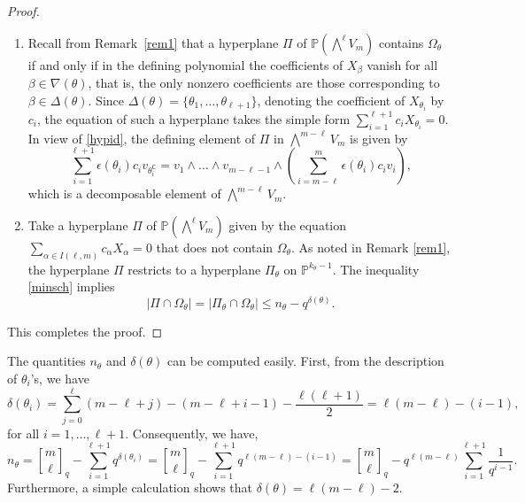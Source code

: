 \documentclass[10pt,a4paper,oneside]{amsproc}
\def\a{{\alpha}}
\def\PP{{\mathbb P}}
\begin{document}
\begin{proof}
    \
    \begin{enumerate}
        \item[(a)] Recall from Remark~\ref{rem1} that a hyperplane $\Pi$ of $\PP\left(\bigwedge^{\ell} V_m\right)$ contains $\Omega_\theta$ if and only if in the defining polynomial the coefficients of $X_\beta$  vanish  for all $\beta \in \nabla(\theta)$, that is, the only nonzero 
coefficients are those corresponding to $\beta \in \Delta(\theta)$. 
Since $\Delta(\theta) = \{\theta_1, \ldots, \theta_{\ell+1}\}$, 
denoting the coefficient of $X_{\theta_i}$ by $c_i$, the 
equation of such a hyperplane takes the simple form 
$\sum_{i=1}^{\ell+1} c_i X_{\theta_i} = 0$.  In view of \eqref{hypid}, the defining element of $\Pi$ in $\bigwedge^{m-\ell} V_m$ is given by 
$$\sum_{i=1}^{\ell+1} \epsilon(\theta_i) c_i v_{\theta_i^{\mathsf{C}}} = v_1 \wedge \dots \wedge v_{m-\ell - 1} \wedge \left(\sum_{i = m-\ell}^m \epsilon(\theta_i) c_i v_i\right),$$
which is a decomposable element of $\bigwedge^{m - \ell} V_{m}$. 
\item[(b)] Take a hyperplane $\Pi$ of $\PP\left(\bigwedge^\ell V_{m} \right)$ given by the equation $\displaystyle{\sum_{\a \in I(\ell, m)}} c_\a X_\a = 0$ that does not contain $\Omega_\theta$. As noted in Remark \ref{rem1}, the hyperplane $\Pi$ restricts to a hyperplane $\Pi_\theta$ on $\PP^{k_\theta - 1}$. The inequality \eqref{minsch} implies 
$$  
    |\Pi \cap \Omega_\theta| = |\Pi_\theta \cap \Omega_\theta| \le n_{\theta} - q^{\delta (\theta)}.
$$
    \end{enumerate}
    This completes the proof.
\end{proof}

The quantities $n_{\theta}$ and $\delta ({\theta})$ can be computed  easily. First, from the description of $\theta_i$'s, we have 
\begin{equation}\label{deltheta}
\delta (\theta_i) = \sum_{j=0}^{\ell} (m- \ell + j) - (m - \ell + i - 1) - \frac{\ell(\ell + 1)}{2} = \ell (m - \ell) - (i-1),
\end{equation}
for all $i= 1, \dots, \ell + 1$. Consequently, we have, 
\begin{equation}\label{ntheta}
n_\theta = {m \brack \ell}_q - \sum_{i=1}^{\ell + 1} q^{\delta (\theta_i)} =  {m \brack \ell}_q - \sum_{i=1}^{\ell + 1} q^{\ell (m - \ell) - (i - 1)} = {m \brack \ell}_q - q^{\ell(m-\ell)} \sum_{i=1}^{\ell + 1} \frac{1}{q^{i-1}}.
\end{equation}
Furthermore, a simple calculation shows that $\delta (\theta) = \ell (m - \ell) - 2$. 
\end{document}
